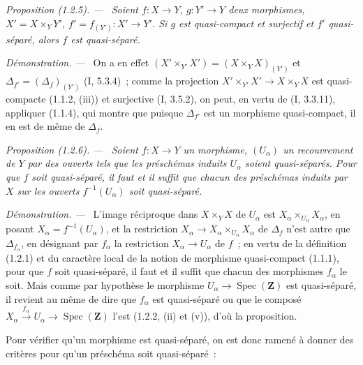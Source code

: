 \documentclass[10pt,oneside]{book}
\makeatletter
\newcommand{\setmanualcurrentlabel}[1]{\def\@currentlabel{#1}}
\newcommand{\oldpage}[2][]{%
  \setcounter{footnote}{0}%
  \marginpar{\scriptsize\textbf{#1}~|~#2}\ignorespaces}
\newenvironment{proposition}[1][]{%
  \setmanualcurrentlabel{#1}\par\medskip\noindent\itshape Proposition (#1). ---\ }{\par}
\newenvironment{proof}{%
  \par\medskip\noindent\textit{Démonstration. ---\ }}{\par}
\makeatother
\begin{document}
\begin{proposition}[1.2.5]
\label{IV.1.2.5-fr}
Soient $f:X\to Y$, $g:Y'\to Y$ deux morphismes,
$X'=X\times_Y Y'$, $f'=f_{(Y')}:X'\to Y'$. Si $g$ est quasi-compact et
surjectif et $f'$ quasi-séparé, alors $f$ est quasi-séparé.
\end{proposition}

\begin{proof}
On a en effet $(X'\times_{Y'}X')=(X\times_YX)_{(Y')}$ et
$\Delta_{f'}=(\Delta_f)_{(Y')}$ (I, 5.3.4)~; comme la projection
$X'\times_{Y'}X'\to X\times_YX$ est quasi-compacte (1.1.2, (iii)) et
surjective (I, 3.5.2), on peut, en vertu de (I, 3.3.11), appliquer (1.1.4),
qui montre que puisque $\Delta_{f'}$ est un morphisme quasi-compact, il en est
de même de $\Delta_f$.
\end{proof}

\begin{proposition}[1.2.6]
\label{IV.1.2.6-fr}
Soient $f:X\to Y$ un morphisme, $(U_\alpha)$ un recouvrement de $Y$ par des
ouverts tels que les préschémas induits $U_\alpha$ soient quasi-séparés. Pour
que $f$ soit quasi-séparé, il faut et il suffit que chacun des préschémas
induits par $X$ sur les ouverts $f^{-1}(U_\alpha)$ soit quasi-séparé.
\end{proposition}

\begin{proof}
L'image réciproque dans $X\times_YX$ de $U_\alpha$ est
$X_\alpha\times_{U_\alpha}X_\alpha$, en posant
$X_\alpha=f^{-1}(U_\alpha)$, et la restriction
$X_\alpha\to X_\alpha\times_{U_\alpha}X_\alpha$ de $\Delta_f$ n'est autre
que $\Delta_{f_\alpha}$, en désignant par $f_\alpha$ la restriction
$X_\alpha\to U_\alpha$ de $f$~; en vertu de la définition (1.2.1) et du
caractère local de la notion de morphisme quasi-compact (1.1.1), pour que $f$
soit quasi-séparé, il faut et il suffit que chacun des morphismes $f_\alpha$
le soit. Mais comme par hypothèse le morphisme
$U_\alpha\to\operatorname{Spec}(\mathbf Z)$ est quasi-séparé, il revient au
même de dire que $f_\alpha$ est quasi-séparé ou que le composé
$X_\alpha\xrightarrow{f_\alpha}U_\alpha\to\operatorname{Spec}(\mathbf Z)$
l'est (1.2.2, (ii) et (v)), d'où la proposition.
\end{proof}

\oldpage[IV-1]{228}

Pour vérifier qu'un morphisme est quasi-séparé, on est donc ramené à donner
des critères pour qu'un préschéma soit quasi-séparé~:
\end{document}
